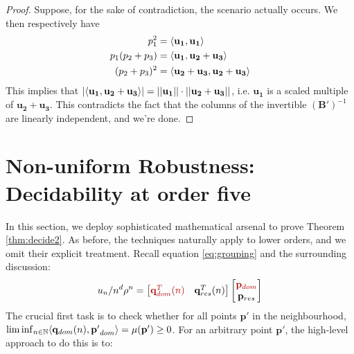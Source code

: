 \begin{proof}
\begin{table}[H]
\end{table}
Suppose, for the sake of contradiction, the scenario actually occurs. We then respectively have
\begin{align*}
p_1^2 &= \langle\mathbf{u_1}, \mathbf{u_1}\rangle \\
p_1(p_2 + p_3) &= \langle\mathbf{u_1}, \mathbf{u_2} + \mathbf{u_3}\rangle \\
(p_2 + p_3)^2 &= \langle\mathbf{u_2} + \mathbf{u_3}, \mathbf{u_2} + \mathbf{u_3}\rangle
\end{align*}
This implies that $|\langle\mathbf{u_1}, \mathbf{u_2} + \mathbf{u_3}\rangle| = ||\mathbf{u_1}||\cdot||\mathbf{u_2} + \mathbf{u_3}||$, i.e. $\mathbf{u_1}$ is a scaled multiple of $\mathbf{u_2} + \mathbf{u_3}$. This contradicts the fact that the columns of the invertible $(\mathbf{B'})^{-1}$ are linearly independent, and we're done.
\end{proof}

\section{Non-uniform Robustness: Decidability at order five}
\label{section:decidability2}
In this section, we deploy sophisticated mathematical arsenal to prove Theorem \ref{thm:decide2}. As before, the techniques naturally apply to lower orders, and we omit their explicit treatment. Recall equation \ref{eq:grouping} and the surrounding discussion:
\begin{equation}
u_n/n^d\rho^n = \begin{bmatrix}
{\color{red!70!black} \mathbf{q}_{dom}^T(n) } & \mathbf{q}_{res}^T(n)
\end{bmatrix}
\begin{bmatrix}
{\color{red!70!black} \mathbf{p}_{dom}} \\
\mathbf{p}_{res}
\end{bmatrix}
\end{equation}
The crucial first task is to check whether for all points $\mathbf{p'}$ in the neighbourhood, \\$\liminf_{n\in\mathbb{N}}\langle\mathbf{q}_{dom}(n), \mathbf{p'}_{dom}\rangle = \mu(\mathbf{p'}) \ge 0$. For an arbitrary point $\mathbf{p'}$, the high-level approach to do this is to:

